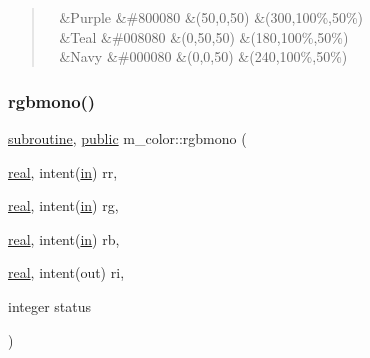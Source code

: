 \begin{DoxyDescription}
\begin{DoxyPre}
\begin{DoxyPre}
\begin{quote}
\begin{longtabu}
~  &Purple        &\#800080  &(50,0,50)      &(300\textordmasculine{},100\%,50\%)   
 \\
~  &Teal          &\#008080  &(0,50,50)      &(180\textordmasculine{},100\%,50\%)   
 \\
~  &Navy          &\#000080  &(0,0,50)       &(240\textordmasculine{},100\%,50\%)     
 \\
\end{longtabu}
\end{quote}
\end{DoxyPre}
\end{DoxyPre}



\begin{DoxyPre}
\begin{DoxyPre} \end{DoxyPre}
\end{DoxyPre}

\end{DoxyDescription}\mbox{\label{namespacem__color_aca19999686fc20d79da580c6a643dc35}} 
\subsubsection{\texorpdfstring{rgbmono()}{rgbmono()}}
{\footnotesize\ttfamily \hyperlink{M__stopwatch_83_8txt_acfbcff50169d691ff02d4a123ed70482}{subroutine}, \hyperlink{M__stopwatch_83_8txt_a2f74811300c361e53b430611a7d1769f}{public} m\+\_\+color\+::rgbmono (\begin{DoxyParamCaption}\item[{\hyperlink{read__watch_83_8txt_abdb62bde002f38ef75f810d3a905a823}{real}, intent(\hyperlink{M__journal_83_8txt_afce72651d1eed785a2132bee863b2f38}{in})}]{rr,  }\item[{\hyperlink{read__watch_83_8txt_abdb62bde002f38ef75f810d3a905a823}{real}, intent(\hyperlink{M__journal_83_8txt_afce72651d1eed785a2132bee863b2f38}{in})}]{rg,  }\item[{\hyperlink{read__watch_83_8txt_abdb62bde002f38ef75f810d3a905a823}{real}, intent(\hyperlink{M__journal_83_8txt_afce72651d1eed785a2132bee863b2f38}{in})}]{rb,  }\item[{\hyperlink{read__watch_83_8txt_abdb62bde002f38ef75f810d3a905a823}{real}, intent(out)}]{ri,  }\item[{integer}]{status }\end{DoxyParamCaption})}


